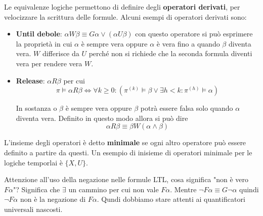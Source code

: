 Le equivalenze logiche permettono di definire degli \textbf{operatori derivati},
per velocizzare la scrittura delle formule. Alcuni esempi di operatori derivati
sono:
\begin{itemize}
    \item \textbf{Until debole}: $\alpha W \beta \equiv G\alpha \lor
              (\alpha U \beta)$ con questo operatore si può esprimere la proprietà
          in cui $\alpha$ è sempre vera oppure $\alpha$ è vera fino a quando
          $\beta$ diventa vera. $W$ differisce da $U$ perché non si richiede che 
          la seconda formula diventi vera per rendere vera $W$.
    \item \textbf{Release}: $\alpha R \beta$ per cui
          \begin{equation}
              \pi\vDash\alpha R \beta \iff \forall k\ge 0:(\pi^{(k)}\vDash \beta\lor
              \exists h<k:\pi^{(h)}\vDash \alpha)
          \end{equation}

          In sostanza o $\beta$ è sempre vera oppure $\beta$ potrà essere falsa
          solo quando $\alpha$ diventa vera. Definito in questo modo allora si può dire
          \begin{equation}
              \alpha R \beta \equiv \beta W (\alpha \land \beta)
          \end{equation}
\end{itemize}
\begin{definizione}
    L'insieme degli operatori è detto \textbf{minimale} se ogni altro
    operatore può essere definito a partire da questi. Un esempio di inisieme di
    operatori minimale per le logiche temporlai è $\{X,U\}$.
\end{definizione}
Attenzione all'uso della negazione nelle formule LTL, cosa significa "non è vero
$F\alpha$"?  Significa che $\exists$ un cammino per cui non vale $F\alpha$.  Mentre
$\lnot F\alpha \equiv G\lnot \alpha$ quindi $\lnot F\alpha$ non è la negazione di
$F\alpha$. Qundi dobbiamo stare attenti ai quantificatori universali nascosti.

